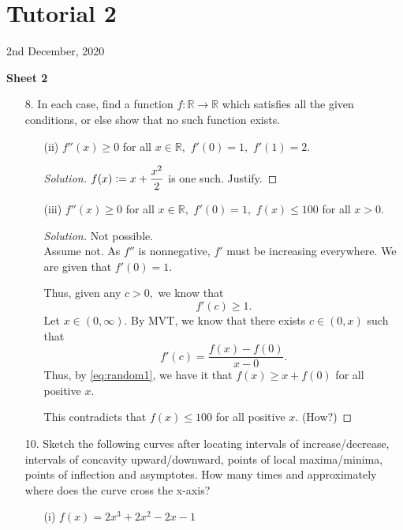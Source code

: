 \documentclass[12pt]{article}
\theoremstyle{definition}
\newenvironment{soln}{\begin{proof}[Solution]}{\end{proof}}
\begin{document}
\newpage\section{Tutorial 2}
\begin{center}
	2nd December, 2020
\end{center}
\textbf{Sheet 2}
\begin{itemize}
	\item[8.] In each case, find a function $f:\mathbb{R}\to\mathbb{R}$ which satisfies all the given conditions, or else show that no such function exists.
	\begin{itemize}
		\item[(ii)] $f''(x) \ge 0$ for all $x \in \mathbb{R},$ $f'(0) = 1,$ $f'(1) = 2.$

		\begin{soln}
			$f(x) \vcentcolon= x + \dfrac{x^2}{2}$ is one such. Justify.
		\end{soln}

		\item[(iii)] $f''(x) \ge 0$ for all $x \in \mathbb{R},$ $f'(0) = 1,$ $f(x) \le 100$ for all $x > 0.$
		\begin{soln}
			Not possible.\\
			Assume not. As $f''$ is nonnegative, $f'$ must be increasing everywhere. We are given that $f'(0) = 1.$ 

			Thus, given any $c > 0,$ we know that 
			\begin{equation} \label{eq:random1} \tag{$*$}
				f'(c) \ge 1.
			\end{equation}
			Let $x \in (0, \infty).$ By MVT, we know that there exists $c \in (0, x)$ such that 
			\begin{equation*} 
				f'(c) = \dfrac{f(x) - f(0)}{x - 0}.
			\end{equation*} 
			Thus, by \cref{eq:random1}, we have it that $f(x) \ge x + f(0)$ for all positive $x.$ 

			This contradicts that $f(x) \le 100$ for all positive $x.$ (How?)
		\end{soln}
	\end{itemize}
	\newpage

	\item[10.] Sketch the following curves after locating intervals of increase/decrease, intervals of concavity upward/downward, points of local maxima/minima, points of inflection and asymptotes. How many times and approximately where does the curve cross the x-axis?
	\begin{itemize}
		\item[(i)] $f(x) = 2x^3 + 2x^2 - 2x - 1$ 


\end{itemize}
\end{itemize}
\end{document}
